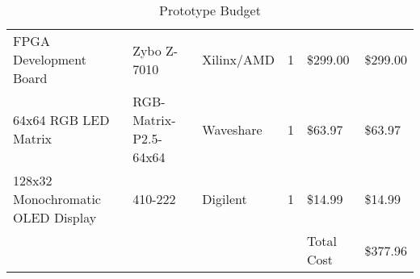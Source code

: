 \begin{table}[H]
	\begin{tabularx}{\textwidth}{| x | a | a | a | a | a |}
		\hline
		                    &           &    &  &  &  \\
		\hline
		FPGA Development Board            & Zybo Z-7010           & Xilinx/AMD & 1        & \$299.00        & \$299.00            \\
		\hline
		64x64 RGB LED Matrix              & RGB-Matrix-P2.5-64x64 & Waveshare  & 1        & \$63.97         & \$63.97             \\
		\hline
		128x32 Monochromatic OLED Display & 410-222               & Digilent   & 1        & \$14.99         & \$14.99             \\
		\hline
		                                  &                       &            &          & Total Cost      & \$377.96            \\
		\hline
	\end{tabularx}
	\caption{Prototype Budget}
\end{table}

